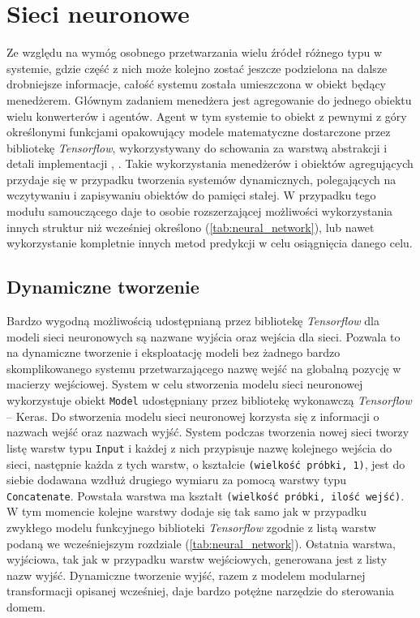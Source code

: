 \section{Sieci neuronowe}
Ze względu na wymóg osobnego przetwarzania wielu źródeł różnego typu w systemie, gdzie część z nich może kolejno zostać jeszcze podzielona na dalsze drobniejsze informacje, całość systemu została umieszczona w obiekt będący menedżerem. Głównym zadaniem menedżera jest agregowanie do jednego obiektu wielu konwerterów i agentów. Agent w tym systemie to obiekt z pewnymi z góry określonymi funkcjami opakowujący modele matematyczne dostarczone przez bibliotekę \textit{Tensorflow}, wykorzystywany do schowania za warstwą abstrakcji i detali implementacji \cite{book:programming_abstraction}, \cite{book:czysty_kod}. Takie wykorzystania menedżerów i obiektów agregujących przydaje się w przypadku tworzenia systemów dynamicznych, polegających na wczytywaniu i zapisywaniu obiektów do pamięci stałej. W przypadku tego modułu samouczącego daje to osobie rozszerzającej możliwości wykorzystania innych struktur niż wcześniej określono (\ref{tab:neural_network}), lub nawet wykorzystanie kompletnie innych metod predykcji w celu osiągnięcia danego celu.

\subsection{Dynamiczne tworzenie}
Bardzo wygodną możliwością udostępnianą przez bibliotekę \textit{Tensorflow} dla modeli sieci neuronowych są nazwane wyjścia oraz wejścia dla sieci. Pozwala to na dynamiczne tworzenie i eksploatację modeli bez żadnego bardzo skomplikowanego systemu przetwarzającego nazwę wejść na globalną pozycję w macierzy wejściowej. System w celu stworzenia modelu sieci neuronowej wykorzystuje obiekt \verb+Model+ udostępniany przez bibliotekę wykonawczą \textit{Tensorflow} -- Keras. Do stworzenia modelu sieci neuronowej korzysta się z informacji o nazwach wejść oraz nazwach wyjść. System podczas tworzenia nowej sieci tworzy listę warstw typu \verb+Input+ i każdej z nich przypisuje nazwę kolejnego wejścia do sieci, następnie każda z tych warstw, o kształcie \verb+(wielkość próbki, 1)+, jest do siebie dodawana wzdłuż drugiego wymiaru za pomocą warstwy typu \verb+Concatenate+. Powstała warstwa ma kształt \verb+(wielkość próbki, ilość wejść)+. W tym momencie kolejne warstwy dodaje się tak samo jak w przypadku zwykłego modelu funkcyjnego biblioteki \textit{Tensorflow} zgodnie z listą warstw podaną we wcześniejszym rozdziale (\ref{tab:neural_network}). Ostatnia warstwa, wyjściowa, tak jak w przypadku warstw wejściowych, generowana jest z listy nazw wyjść. Dynamiczne tworzenie wyjść, razem z modelem modularnej transformacji opisanej wcześniej, daje bardzo potężne narzędzie do sterowania domem.

